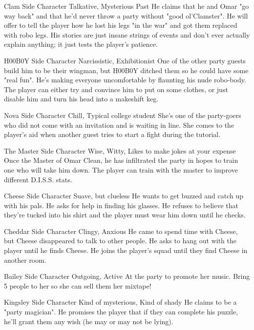 {Clam}
{Side Character}
{Talkative, Mysterious Past}
{He claims that he and Omar "go way back" and that he'd never throw a party without "good ol'Clamster".}
{He will offer to tell the player how he lost his legs "in the war" and got them replaced with robo legs. His stories are just insane strings of events and don't ever actually explain anything; it just tests the player's patience.}

{H00B0Y}
{Side Character}
{Narcissistic, Exhibitionist}
{One of the other party guests build him to be their wingman, but H00B0Y ditched them so he could have some "real fun".}
{He's making everyone uncomfortable by flaunting his nude robo-body. The player can either try and convince him to put on some clothes, or just disable him and turn his head into a makeshift keg.}

{Nova}
{Side Character}
{Chill, Typical college student}
{She's one of the party-goers who did not come with an invitation and is waiting in line.}
{She comes to the player's aid when another guest tries to start a fight during the tutorial.}

{The Master}
{Side Character}
{Wise, Witty, Likes to make jokes at your expense}
{Once the Master of Omar Clean, he has infiltrated the party in hopes to train one who will take him down.}
{The player can train with the master to improve different D.I.S.S. stats.}

{Cheese}
{Side Character}
{Suave, but clueless}
{He wants to get buzzed and catch up with his pals.}
{He asks for help in finding his glasses. He refuses to believe that they're tucked into his shirt and the player must wear him down until he checks.}

{Cheddar}
{Side Character}
{Clingy, Anxious}
{He came to spend time with Cheese, but Cheese disappeared to talk to other people.}
{He asks to hang out with the player until he finds Cheese. He joins the player's squad until they find Cheese in another room.}

{Bailey}
{Side Character}
{Outgoing, Active}
{At the party to promote her music.}
{Bring 5 people to her so she can sell them her mixtape!}

{Kingsley}
{Side Character}
{Kind of mysterious, Kind of shady}
{He claims to be a "party magician".}
{He promises the player that if they can complete his puzzle, he'll grant them any wish (he may or may not be lying).}

